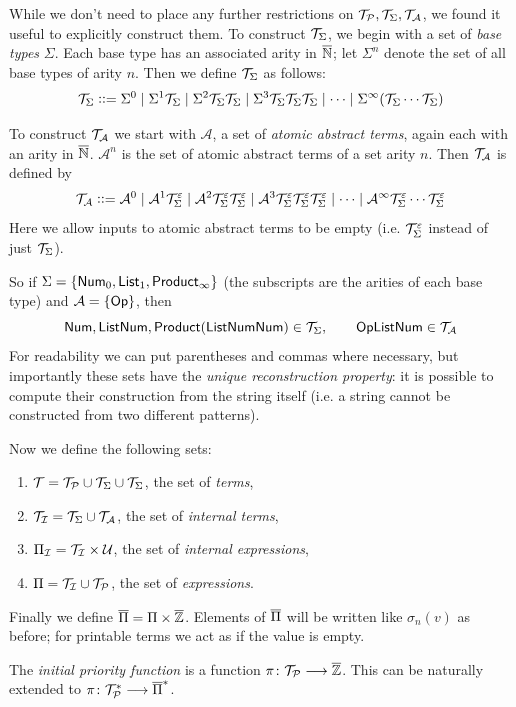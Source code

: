 \documentclass{llncs}
\begin{document}
While we don't need to place any further restrictions on $\mathcal T_{\mathcal P},\mathcal T_{\Sigma},\mathcal T_{\mathcal A}$, we found it useful to explicitly construct them.
To construct $\mathcal T_{\Sigma}$, we begin with a set of \textit{base types} $\Sigma$.
Each base type has an associated arity in $\overline{\mathbb N}$; let $\Sigma^n$ denote the set of all base types of arity $n$.
Then we define $\mathcal T_{\Sigma}$ as follows:
\[ \mathcal T_{\Sigma} \mathrel{{\mathop:}{\mathop:}{=}} \Sigma^0 \mid \Sigma^1\mathcal T_{\Sigma} \mid \Sigma^2\mathcal T_{\Sigma}\mathcal T_{\Sigma} \mid \Sigma^3\mathcal T_{\Sigma}\mathcal T_{\Sigma}\mathcal T_{\Sigma} \mid \cdots \mid \Sigma^\infty(\mathcal T_{\Sigma}\cdots\mathcal T_{\Sigma}) \]

To construct $\mathcal T_{\mathcal A}$ we start with $\mathcal A$, a set of \textit{atomic abstract terms}, again each with an arity in $\overline{\mathbb N}$.
$\mathcal A^n$ is the set of atomic abstract terms of a set arity $n$.
Then $\mathcal T_{\mathcal A}$ is defined by
\[ \mathcal T_{\mathcal A} \mathrel{{\mathop:}{\mathop:}{=}} \mathcal A^0\mid\mathcal A^1\mathcal T_{\Sigma}^\varepsilon\mid\mathcal A^2\mathcal T_{\Sigma}^\varepsilon\mathcal T_{\Sigma}^\varepsilon\mid\mathcal A^3\mathcal T_{\Sigma}^\varepsilon\mathcal T_{\Sigma}^\varepsilon\mathcal T_{\Sigma}^\varepsilon\mid\cdots\mid
\mathcal A^\infty\mathcal T_{\Sigma}^\varepsilon\cdots\mathcal T_{\Sigma}^\varepsilon \]
Here we allow inputs to atomic abstract terms to be empty (i.e. $\mathcal T_{\Sigma}^\varepsilon$ instead of just $\mathcal T_{\Sigma}$).

So if $\Sigma=\set{\NUM_0,\LIST_1,\PRODUCT_\infty}$ (the subscripts are the arities of each base type) and $\mathcal A=\set{\OP}$, then
\[ \mathsf{Num},\mathsf{List}\mathsf{Num},\mathsf{Product}(\mathsf{List}\mathsf{Num}\mathsf{Num})\in\mathcal T_{\Sigma},\qquad \mathsf{Op}\mathsf{List}\mathsf{Num}\in\mathcal T_{\mathcal A} \]
For readability we can put parentheses and commas where necessary, but importantly these sets have the \textit{unique reconstruction property}: it is possible to compute their construction from the
string itself (i.e. a string cannot be constructed from two different patterns).

Now we define the following sets:
\begin{enumerate}
    \item $\mathcal T=\mathcal T_{\mathcal P}\cup\mathcal T_{\Sigma}\cup\mathcal T_{\Sigma}$, the set of \textit{terms},
    \item $\mathcal T_{\mathcal I}=\mathcal T_{\Sigma}\cup\mathcal T_{\mathcal A}$, the set of \textit{internal terms},
    \item $\Pi_{\mathcal I}=\mathcal T_{\mathcal I}\times\mathcal U$, the set of \textit{internal expressions},
    \item $\Pi=\mathcal T_{\mathcal I}\cup\mathcal T_{\mathcal P}$, the set of \textit{expressions}.
\end{enumerate}
Finally we define $\overline{\Pi}=\Pi\times\overline{\mathbb Z}$.
Elements of $\overline{\Pi}$ will be written like $\sigma_n(v)$ as before; for printable terms we act as if the value is empty.

The \textit{initial priority function} is a function $\pi\colon\mathcal T_{\mathcal P}\longrightarrow\overline{\mathbb Z}$.
This can be naturally extended to $\pi\colon\mathcal T_{\mathcal P}^*\longrightarrow\overline{\Pi}^*$.
\end{document}
